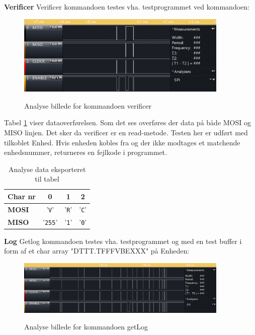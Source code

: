 \textbf{Verificer}
Verificer kommandoen testes vha. testprogrammet ved kommandoen: 


\begin{figure}[H]
\centering
{\includegraphics[width=0.90\textwidth]{filer/modultest/Billeder/verify}}
\caption{Analyse billede for kommandoen verificer}
\label{lab:scop_verify}
\end{figure}

Tabel \ref{table:scop_verify} viser dataoverførelsen. Som det ses overføres der data på både MOSI og MISO linjen. Det sker da verificer er en read-metode. Testen her er udført med tilkoblet Enhed. Hvis enheden kobles fra og der ikke modtages et matchende enhedsnummer, returneres en fejlkode i programmet. 
 

\begin{table}[H]
	\caption{Analyse data eksporteret til tabel}
	\centering
	\begin{tabular}{|l|c|c|c|}
		\hline 
		\textbf{Char nr} & \textbf{0} & \textbf{1} & \textbf{2}\\ 		
		\hline 
		\textbf{MOSI} & '\verb+V+' & '\verb+R+'  & '\verb+C+'\\ 
		\hline 
		\textbf{MISO} & '\verb+255+' & '\verb+1+' & '\verb+0+' \\ 
		\hline 
	\end{tabular} 
	\label{table:scop_verify}
\end{table}



\textbf{Log}
Getlog kommandoen testes vha. testprogrammet og med en test buffer i form af et char array "DTTT.TFFFVBEXXX" på Enheden: 

\begin{figure}[H]
\centering
{\includegraphics[width=0.90\textwidth]{filer/modultest/Billeder/getlog_and_error}}
\caption{Analyse billede for kommandoen getLog}
\label{lab:scop_getlog}
\end{figure}

